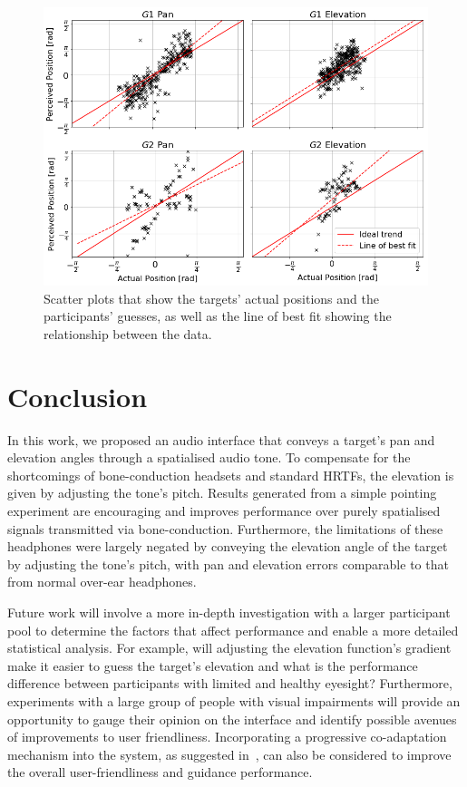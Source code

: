 \documentclass{llncs}
\begin{document}
\begin{figure}[t]
  \centering
  \includegraphics[width=1.0\columnwidth]{figures/correlation.png}
  \caption{Scatter plots that show the targets' actual positions and the participants' guesses, as well as the line of best fit showing the relationship between the data. }\label{fig:correlation-results}
\end{figure}

\section{Conclusion}\label{sec:conclusion}

In this work, we proposed an audio interface that conveys a target's pan and elevation angles through a spatialised audio tone.
To compensate for the shortcomings of bone-conduction headsets and standard HRTFs, the elevation is given by adjusting the tone's pitch.
Results generated from a simple pointing experiment are encouraging and improves performance over purely spatialised signals transmitted via bone-conduction.
Furthermore, the limitations of these headphones were largely negated by conveying the elevation angle of the target by adjusting the tone's pitch, with pan and elevation errors comparable to that from normal over-ear headphones.

Future work will involve a more in-depth investigation with a larger participant pool to determine the factors that affect performance and enable a more detailed statistical analysis.
For example, will adjusting the elevation function's gradient make it easier to guess the target's elevation and what is the performance difference between participants with limited and healthy eyesight?  
Furthermore, experiments with a large group of people with visual impairments will provide an opportunity to gauge their opinion on the interface and identify possible avenues of improvements to user friendliness.
Incorporating a progressive co-adaptation mechanism into the system, as suggested in~\cite{gallina2015progressive}, can also be considered to improve the overall user-friendliness and guidance performance.



\end{document}
